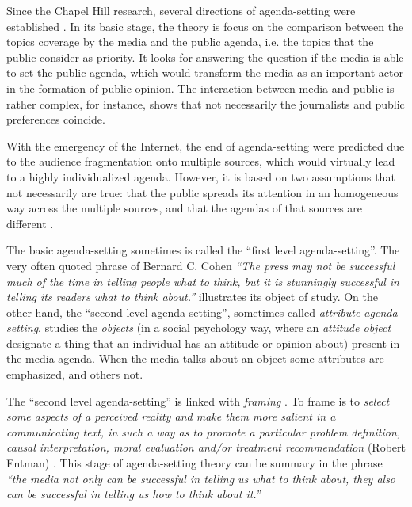 \documentclass{bmcart}
\begin{document}
\par Since the Chapel Hill research, several directions of agenda-setting were established \cite{mccombs2005look}.
In its basic stage, the theory is focus on the comparison between the topics coverage by the media and the public agenda, i.e. the topics that the public consider as priority.
It looks for answering the question if the media is able to set the public agenda, which would transform the media as an important actor in the formation of public opinion. The interaction between media and public is rather complex, for instance, \cite{mitchelstein2016brecha} shows that not necessarily the journalists and public preferences coincide.
\par With the emergency of the Internet, the end of agenda-setting were predicted due to the audience fragmentation onto multiple sources, which would virtually lead to a highly individualized agenda.
However, it is based on two assumptions that not necessarily are true: that the public spreads its attention in an homogeneous way across the multiple sources, and that the agendas of that sources are different \cite{mccombs2005look}.

\par The basic agenda-setting sometimes is called the ``first level agenda-setting''. 
The very often quoted phrase of Bernard C. Cohen \textit{``The press may not be successful much of the time in telling people what to think, but it is stunningly successful in telling its readers what to think about.''} illustrates its object of study.
On the other hand, the ``second level agenda-setting'', sometimes called \textit{attribute agenda-setting}, studies the \textit{objects} (in a social psychology way, where an \textit{attitude object} designate a thing that an individual has an attitude or opinion about) present in the media agenda. When the media talks about an object some attributes are emphasized, and others not. 

\par The ``second level agenda-setting'' is linked with \textit{framing} \cite{guggenheim2015dynamics} \cite{tsur2015frame}. 
To frame is to \textit{select some aspects of a perceived reality and make them more salient in a communicating text, in such a way as to promote a particular problem definition, causal interpretation, moral evaluation and/or treatment recommendation} (Robert Entman) \cite{mccombs2005look}.
This stage of agenda-setting theory can be summary in the phrase \textit{``the media not only can be successful in telling us what to think about, they also can be successful in telling us how to think about it.''} 
\end{document}
